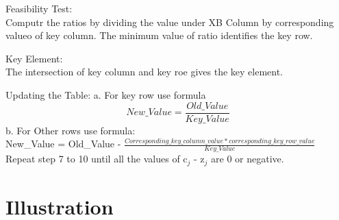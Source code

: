 \begin{algorithm}[H]
\begin{algorithmic}[1]
\STATE Feasibility Test: \\
\tab Computr the ratios by dividing the value under XB Column by corresponding valueo of key column.  The minimum value of ratio identifies the key row. 

\STATE Key Element:\\
\tab The intersection of key column and key roe gives the key element.

\STATE Updating the Table:
\tab a. For key row use formula \begin{equation}
New\_Value = \frac{Old\_Value}{Key\_Value}
\end{equation}
\tab b. For Other rows use formula:\\

New\_Value = Old\_Value - $\frac{Corresponding\_key\_column\_value *  corresponding \_key\_row\_value}{Key\_Value}$ \\

\STATE Repeat step 7 to 10 until all the values of c$_{j}$ - z$_{j}$ are 0 or negative.

\end{algorithmic}

\end{algorithm}


\section{Illustration}

